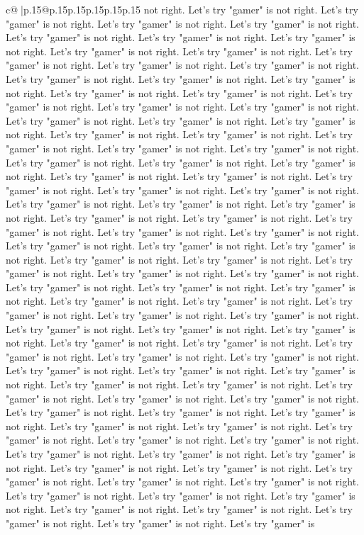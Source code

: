 \documentclass{article}
\begin{document}
{\begin{supertabular}{c@{$\;$}|p{.15\linewidth}@{}p{.15\linewidth}p{.15\linewidth}p{.15\linewidth}p{.15\linewidth}p{.15\linewidth}}
{{{not right. Let's try "gamer" is not right. Let's try "gamer" is not right. Let's try "gamer" is not right. Let's try "gamer" is not right. Let's try "gamer" is not right. Let's try "gamer" is not right. Let's try "gamer" is not right. Let's try "gamer" is not right. Let's try "gamer" is not right. Let's try "gamer" is not right. Let's try "gamer" is not right. Let's try "gamer" is not right. Let's try "gamer" is not right. Let's try "gamer" is not right. Let's try "gamer" is not right. Let's try "gamer" is not right. Let's try "gamer" is not right. Let's try "gamer" is not right. Let's try "gamer" is not right. Let's try "gamer" is not right. Let's try "gamer" is not right. Let's try "gamer" is not right. Let's try "gamer" is not right. Let's try "gamer" is not right. Let's try "gamer" is not right. Let's try "gamer" is not right. Let's try "gamer" is not right. Let's try "gamer" is not right. Let's try "gamer" is not right. Let's try "gamer" is not right. Let's try "gamer" is not right. Let's try "gamer" is not right. Let's try "gamer" is not right. Let's try "gamer" is not right. Let's try "gamer" is not right. Let's try "gamer" is not right. Let's try "gamer" is not right. Let's try "gamer" is not right. Let's try "gamer" is not right. Let's try "gamer" is not right. Let's try "gamer" is not right. Let's try "gamer" is not right. Let's try "gamer" is not right. Let's try "gamer" is not right. Let's try "gamer" is not right. Let's try "gamer" is not right. Let's try "gamer" is not right. Let's try "gamer" is not right. Let's try "gamer" is not right. Let's try "gamer" is not right. Let's try "gamer" is not right. Let's try "gamer" is not right. Let's try "gamer" is not right. Let's try "gamer" is not right. Let's try "gamer" is not right. Let's try "gamer" is not right. Let's try "gamer" is not right. Let's try "gamer" is not right. Let's try "gamer" is not right. Let's try "gamer" is not right. Let's try "gamer" is not right. Let's try "gamer" is not right. Let's try "gamer" is not right. Let's try "gamer" is not right. Let's try "gamer" is not right. Let's try "gamer" is not right. Let's try "gamer" is not right. Let's try "gamer" is not right. Let's try "gamer" is not right. Let's try "gamer" is not right. Let's try "gamer" is not right. Let's try "gamer" is not right. Let's try "gamer" is not right. Let's try "gamer" is not right. Let's try "gamer" is not right. Let's try "gamer" is not right. Let's try "gamer" is not right. Let's try "gamer" is not right. Let's try "gamer" is not right. Let's try "gamer" is not right. Let's try "gamer" is not right. Let's try "gamer" is not right. Let's try "gamer" is not right. Let's try "gamer" is not right. Let's try "gamer" is not right. Let's try "gamer" is not right. Let's try "gamer" is not right. Let's try "gamer" is not right. Let's try "gamer" is not right. Let's try "gamer" is not right. Let's try "gamer" is not right. Let's try "gamer" is not right. Let's try "gamer" is not right. Let's try "gamer" is not right. Let's try "gamer" is not right. Let's try "gamer" is not right. Let's try "gamer" is not right. Let's try "gamer" is not right. Let's try "gamer" is not right. Let's try "gamer" is }}}
\end{supertabular}}
\end{document}
